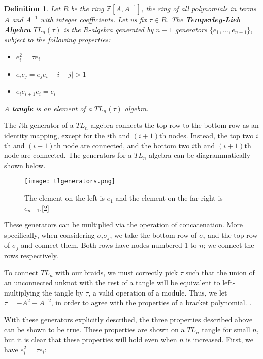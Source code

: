 \documentclass[12pt]{article}
\newcommand{\Z}{\mathbb{Z}}
\newtheorem{definition}{Definition}[section]
\begin{document}
\begin{definition}
Let $R$ be the ring $\Z[A, A^{-1}]$, the ring of all polynomials in terms $A$ and $A^{-1}$ with integer coefficients. Let us fix $\tau \in R$. The \textbf{Temperley-Lieb Algebra} $TL_n(\tau)$ is the $R$-algebra generated by $n-1$ generators $\{e_1, ..., e_{n-1}\}$, subject to the following properties:

\begin{itemize}
\item $e_i^2 = \tau e_i$
\item $e_i e_j = e_j e_i \quad |i - j| > 1$
\item $e_i e_{i \pm 1} e_i = e_i$
\end{itemize}

A \textbf{tangle} is an element of a $TL_n(\tau)$ algebra. 
\end{definition}

The $i$th generator of a $TL_n$ algebra connects the top row to the bottom row as an identity mapping, except for the $i$th and $(i+1)$th nodes. Instead, the top two $i$th and $(i+1)$th node are connected, and the bottom two $i$th and $(i+1)$th node are connected. The generators for a $TL_n$ algebra can be diagrammatically shown below. 

\begin{figure}[H]
\centering
\texttt{[image: tlgenerators.png]}
\caption{\label{Temperley Leib} The element on the left is $e_1$ and the element on the far right is $e_{n-1}$.[2]}
\end{figure}

These generators can be multiplied via the operation of concatenation. More specifically, when considering $\sigma_i \sigma_j$, we take the bottom row of $\sigma_i$ and the top row of $\sigma_j$ and connect them. Both rows have nodes numbered 1 to $n$; we connect the rows respectively. 
 
To connect $TL_n$ with our braids, we must correctly pick $\tau$ such that the union of an unconnected unknot with the rest of a tangle will be equivalent to left-multiplying the tangle by $\tau$, a valid operation of a module. Thus, we let $\tau = -A^2 - A^{-2}$, in order to agree with the properties of a bracket polynomial. . 
 
With these generators explicitly described, the three properties described above can be shown to be true. These properties are shown on a $TL_n$ tangle for small $n$, but it is clear that these properties will hold even when $n$ is increased.  First, we have $e_i^2 = \tau e_i$: 
\end{document}
